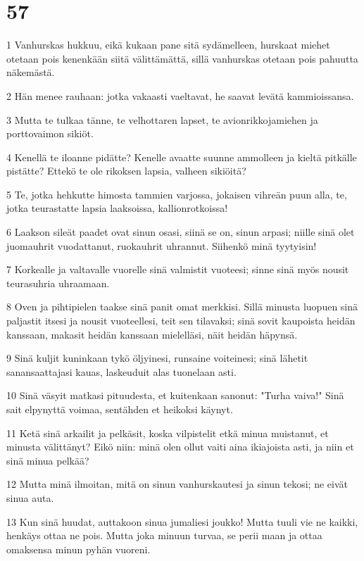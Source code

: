 \chapter{57}

\par 1 Vanhurskas hukkuu, eikä kukaan pane sitä sydämelleen, hurskaat miehet otetaan pois kenenkään siitä välittämättä, sillä vanhurskas otetaan pois pahuutta näkemästä.
\par 2 Hän menee rauhaan: jotka vakaasti vaeltavat, he saavat levätä kammioissansa.
\par 3 Mutta te tulkaa tänne, te velhottaren lapset, te avionrikkojamiehen ja porttovaimon sikiöt.
\par 4 Kenellä te iloanne pidätte? Kenelle avaatte suunne ammolleen ja kieltä pitkälle pistätte? Ettekö te ole rikoksen lapsia, valheen sikiöitä?
\par 5 Te, jotka hehkutte himosta tammien varjossa, jokaisen vihreän puun alla, te, jotka teurastatte lapsia laaksoissa, kallionrotkoissa!
\par 6 Laakson sileät paadet ovat sinun osasi, siinä se on, sinun arpasi; niille sinä olet juomauhrit vuodattanut, ruokauhrit uhrannut. Siihenkö minä tyytyisin!
\par 7 Korkealle ja valtavalle vuorelle sinä valmistit vuoteesi; sinne sinä myös nousit teurasuhria uhraamaan.
\par 8 Oven ja pihtipielen taakse sinä panit omat merkkisi. Sillä minusta luopuen sinä paljastit itsesi ja nousit vuoteellesi, teit sen tilavaksi; sinä sovit kaupoista heidän kanssaan, makasit heidän kanssaan mielelläsi, näit heidän häpynsä.
\par 9 Sinä kuljit kuninkaan tykö öljyinesi, runsaine voiteinesi; sinä lähetit sanansaattajasi kauas, laskeuduit alas tuonelaan asti.
\par 10 Sinä väsyit matkasi pituudesta, et kuitenkaan sanonut: "Turha vaiva!" Sinä sait elpynyttä voimaa, sentähden et heikoksi käynyt.
\par 11 Ketä sinä arkailit ja pelkäsit, koska vilpistelit etkä minua muistanut, et minusta välittänyt? Eikö niin: minä olen ollut vaiti aina ikiajoista asti, ja niin et sinä minua pelkää?
\par 12 Mutta minä ilmoitan, mitä on sinun vanhurskautesi ja sinun tekosi; ne eivät sinua auta.
\par 13 Kun sinä huudat, auttakoon sinua jumaliesi joukko! Mutta tuuli vie ne kaikki, henkäys ottaa ne pois. Mutta joka minuun turvaa, se perii maan ja ottaa omaksensa minun pyhän vuoreni.
